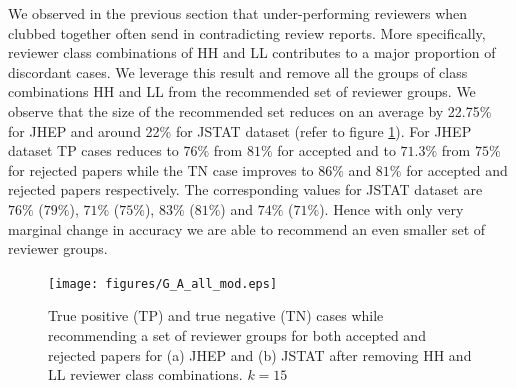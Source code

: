  We observed in the previous section that under-performing reviewers when clubbed together often send in contradicting review reports. More specifically, 
reviewer class combinations of HH and LL contributes to a major proportion of discordant cases. We leverage this result and remove all the groups of class 
combinations HH and LL from the recommended set of reviewer groups. We observe that the size of the recommended set reduces on an average by 22.75\% for 
JHEP and around 22\% for JSTAT dataset (refer to figure \ref{fig:G_A_mod}). For JHEP dataset TP cases reduces to $76\%$ from $81\%$ for accepted and to $71.3\%$ 
from $75\%$ for rejected papers while the TN case improves to $86\%$ and $81\%$ for accepted and rejected papers respectively. The corresponding values for 
JSTAT dataset are $76\%$ ($79\%$), $71\%$ ($75\%$), $83\%$ ($81\%$) and $74\%$ ($71\%$). Hence with only very marginal change in accuracy we are able to recommend 
an even smaller set of reviewer groups. 

\begin{figure}
\texttt{[image: figures/G\_A\_all\_mod.eps]}
\caption{\label{fig:G_A_mod} True positive (TP) and true negative (TN) cases while recommending a set of reviewer groups for both accepted and rejected papers 
for (a) JHEP and (b) JSTAT after removing HH and LL reviewer class combinations. $k = 15$}
\end{figure}
\fi

\medskip
